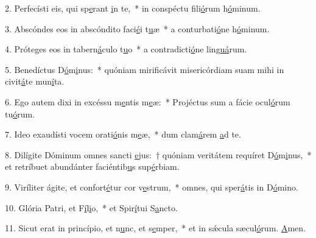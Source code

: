 2. Perfecísti eis, qui sp\uline{e}rant \uline{i}n te,~* in conspéctu fili\uline{ó}rum h\uline{ó}minum.\par 
3. Abscóndes eos in abscóndito faci\uline{é}i t\uline{u}æ~* a conturbati\uline{ó}ne h\uline{ó}minum.\par 
4. Próteges eos in tabern\uline{á}culo t\uline{u}o~* a contradicti\uline{ó}ne lin\uline{guá}rum.\par 
5. Benedíctus D\uline{ó}m\uline{i}nus:~* quóniam mirificávit misericórdiam suam mihi in civit\uline{á}te mun\uline{í}ta.\par 
6. Ego autem dixi in excéssu m\uline{e}ntis m\uline{e}æ:~* Projéctus sum a fácie ocul\uline{ó}rum tu\uline{ó}rum.\par 
7. Ideo exaudísti vocem orati\uline{ó}nis m\uline{e}æ,~* dum clam\uline{á}rem \uline{a}d te.\par 
8. Dilígite Dóminum omnes sancti \uline{e}jus:~† quóniam veritátem requíret D\uline{ó}m\uline{i}nus,~* et retríbuet abundánter faciéntib\uline{u}s sup\uline{é}rbiam.\par 
9. Viríliter ágite, et confort\uline{é}tur cor v\uline{e}strum,~* omnes, qui sper\uline{á}tis in D\uline{ó}mino.\par 
10. Glória Patri, et F\uline{í}l\uline{i}o,~* et Spir\uline{í}tui S\uline{a}ncto.\par 
11. Sicut erat in princípio, et n\uline{u}nc, et s\uline{e}mper,~* et in sǽcula sæcul\uline{ó}rum. \uline{A}men.\par 
